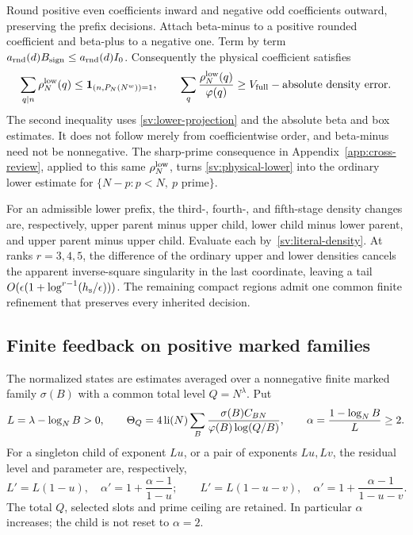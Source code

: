 Round positive even coefficients inward and negative odd coefficients
outward, preserving the prefix decisions.  Attach beta-minus to a positive
rounded coefficient and beta-plus to a negative one.  Term by term
$a_{\rm rnd}(d)B_{\rm sign}\le a_{\rm rnd}(d)I_0$.
Consequently the physical coefficient satisfies
\begin{equation}\label{sv:physical-lower}
 \sum_{q\mid n}\rho_N^{\rm low}(q)\le
       \mathbf 1_{(n,P_N(N^w))=1},\qquad
 \sum_q\frac{\rho_N^{\rm low}(q)}{\varphi(q)}
       \ge V_{\rm full}-\text{absolute density error}.
\end{equation}
The second inequality uses \eqref{sv:lower-projection} and the
absolute beta and box estimates.  It does not follow merely from
coefficientwise order, and beta-minus need not be nonnegative.
The sharp-prime consequence in Appendix~\ref{app:cross-review}, applied
to this same $\rho_N^{\rm low}$, turns \eqref{sv:physical-lower} into the
ordinary lower estimate for $\{N-p:p<N,\ p\text{ prime}\}$.

For an admissible lower prefix, the third-, fourth-, and fifth-stage
density changes are, respectively, upper parent minus upper child,
lower child minus lower parent, and upper parent minus upper child.
Evaluate each by~\eqref{sv:literal-density}.
At ranks $r=3,4,5$, the difference of the ordinary upper and lower
densities cancels the apparent inverse-square singularity in the last
coordinate, leaving a tail
$O(\epsilon(1+\log^{r-1}({h_{\rm s}}/\epsilon)))$.
The remaining compact regions admit one common finite refinement
that preserves every inherited decision.

\subsection{Finite feedback on positive marked families}\label{sv:finite-feedback}

The normalized states are estimates averaged over a nonnegative finite
marked family $\sigma(B)$ with a common total level $Q=N^\lambda$.
Put
\[
 L=\lambda-\log_NB>0,\qquad
 \Theta_Q=4\operatorname{li}(N)\sum_B
       \frac{\sigma(B)C_{BN}}{\varphi(B)\log(Q/B)},\qquad
 \alpha=\frac{1-\log_NB}{L}\ge2.
\]
For a singleton child of exponent $Lu$, or a pair of exponents $Lu,Lv$,
the residual level and parameter are, respectively,
\begin{equation}\label{sv:child-state}
 L'=L(1-u),\quad
 \alpha'=1+\frac{\alpha-1}{1-u};\qquad
 L'=L(1-u-v),\quad
 \alpha'=1+\frac{\alpha-1}{1-u-v}.
\end{equation}
The total $Q$, selected slots and prime ceiling are retained.
In particular $\alpha$ increases; the child is not reset to $\alpha=2$.

